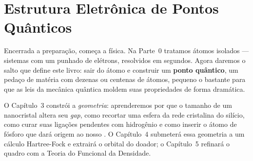 \part{Estrutura Eletrônica de Pontos Quânticos}

\noindent
Encerrada a preparação, começa a física. Na Parte~0 tratamos átomos isolados ---
sistemas com um punhado de elétrons, resolvidos em segundos. Agora daremos o
salto que define este livro: sair do átomo e construir um \textbf{ponto quântico},
um pedaço de matéria com dezenas ou centenas de átomos, pequeno o bastante para
que as leis da mecânica quântica moldem suas propriedades de forma dramática.

\vspace{0.3cm}
\noindent
O Capítulo~3 constrói a \emph{geometria}: aprenderemos por que o tamanho de um
nanocristal altera seu \emph{gap}, como recortar uma esfera da rede cristalina do
silício, como curar suas ligações pendentes com hidrogênio e como inserir o átomo
de fósforo que dará origem ao nosso \qubit{}. O Capítulo~4 submeterá essa
geometria a um cálculo Hartree-Fock e extrairá o orbital do doador; o Capítulo~5
refinará o quadro com a Teoria do Funcional da Densidade.
